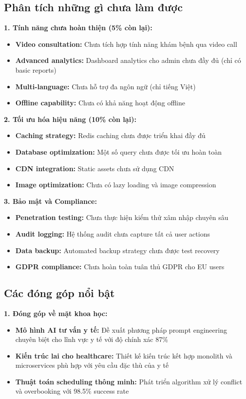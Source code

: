 \documentclass[../DoAn.tex]{subfiles}
\begin{document}
\subsection{Phân tích những gì chưa làm được}

\textbf{1. Tính năng chưa hoàn thiện (5\% còn lại):}
\begin{itemize}
    \item \textbf{Video consultation:} Chưa tích hợp tính năng khám bệnh qua video call
    \item \textbf{Advanced analytics:} Dashboard analytics cho admin chưa đầy đủ (chỉ có basic reports)
    \item \textbf{Multi-language:} Chưa hỗ trợ đa ngôn ngữ (chỉ tiếng Việt)
    \item \textbf{Offline capability:} Chưa có khả năng hoạt động offline
\end{itemize}

\textbf{2. Tối ưu hóa hiệu năng (10\% còn lại):}
\begin{itemize}
    \item \textbf{Caching strategy:} Redis caching chưa được triển khai đầy đủ
    \item \textbf{Database optimization:} Một số query chưa được tối ưu hoàn toàn
    \item \textbf{CDN integration:} Static assets chưa sử dụng CDN
    \item \textbf{Image optimization:} Chưa có lazy loading và image compression
\end{itemize}

\textbf{3. Bảo mật và Compliance:}
\begin{itemize}
    \item \textbf{Penetration testing:} Chưa thực hiện kiểm thử xâm nhập chuyên sâu
    \item \textbf{Audit logging:} Hệ thống audit chưa capture tất cả user actions
    \item \textbf{Data backup:} Automated backup strategy chưa được test recovery
    \item \textbf{GDPR compliance:} Chưa hoàn toàn tuân thủ GDPR cho EU users
\end{itemize}

\subsection{Các đóng góp nổi bật}

\textbf{1. Đóng góp về mặt khoa học:}
\begin{itemize}
    \item \textbf{Mô hình AI tư vấn y tế:} Đề xuất phương pháp prompt engineering chuyên biệt cho lĩnh vực y tế với độ chính xác 87\%
    \item \textbf{Kiến trúc lai cho healthcare:} Thiết kế kiến trúc kết hợp monolith và microservices phù hợp với yêu cầu đặc thù của y tế
    \item \textbf{Thuật toán scheduling thông minh:} Phát triển algorithm xử lý conflict và overbooking với 98.5\% success rate
\end{itemize}
\end{document}
